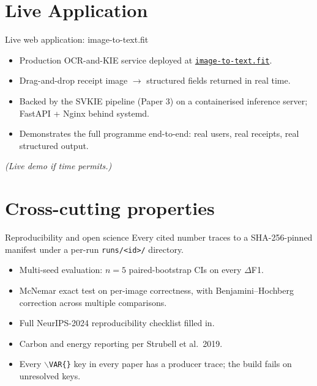 \documentclass{beamer}
\begin{document}
\section{Live Application}
\begin{frame}{Live web application: image-to-text.fit}
  \begin{itemize}
    \item Production OCR-and-KIE service deployed at
          \href{https://image-to-text.fit/}{\texttt{image-to-text.fit}}.
    \item Drag-and-drop receipt image $\rightarrow$ structured fields
          returned in real time.
    \item Backed by the SVKIE pipeline (Paper 3) on a containerised
          inference server; FastAPI + Nginx behind systemd.
    \item Demonstrates the full programme end-to-end: real users,
          real receipts, real structured output.
  \end{itemize}
  \vspace{0.5em}
  \emph{(Live demo if time permits.)}
\end{frame}

\section{Cross-cutting properties}
\begin{frame}{Reproducibility and open science}
  Every cited number traces to a SHA-256-pinned manifest under a
  per-run \texttt{runs/<id>/} directory.
  \vspace{0.5em}
  \begin{itemize}
    \item Multi-seed evaluation: $n = 5$ paired-bootstrap CIs on every
          $\Delta$F1.
    \item McNemar exact test on per-image correctness, with
          Benjamini--Hochberg correction across multiple comparisons.
    \item Full NeurIPS-2024 reproducibility checklist filled in.
    \item Carbon and energy reporting per Strubell et al.\ 2019.
    \item Every \texttt{$\backslash$VAR\{\}} key in every paper has a
          producer trace; the build fails on unresolved keys.
  \end{itemize}
\end{frame}
\end{document}
